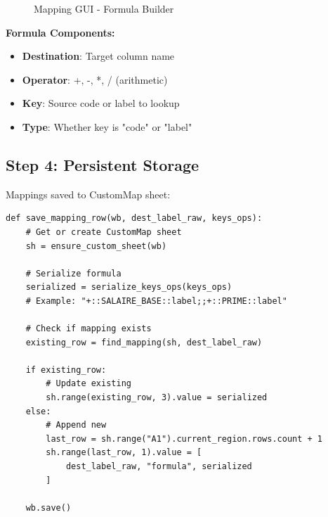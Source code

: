 \begin{figure}[H]
\centering
{}
\caption{Mapping GUI - Formula Builder}
\end{figure}

\textbf{Formula Components:}
\begin{itemize}
    \item \textbf{Destination}: Target column name
    \item \textbf{Operator}: +, -, *, / (arithmetic)
    \item \textbf{Key}: Source code or label to lookup
    \item \textbf{Type}: Whether key is "code" or "label"
\end{itemize}

\subsection{Step 4: Persistent Storage}

Mappings saved to CustomMap sheet:

\begin{lstlisting}[style=pythonstyle]
def save_mapping_row(wb, dest_label_raw, keys_ops):
    # Get or create CustomMap sheet
    sh = ensure_custom_sheet(wb)
    
    # Serialize formula
    serialized = serialize_keys_ops(keys_ops)
    # Example: "+::SALAIRE_BASE::label;;+::PRIME::label"
    
    # Check if mapping exists
    existing_row = find_mapping(sh, dest_label_raw)
    
    if existing_row:
        # Update existing
        sh.range(existing_row, 3).value = serialized
    else:
        # Append new
        last_row = sh.range("A1").current_region.rows.count + 1
        sh.range(last_row, 1).value = [
            dest_label_raw, "formula", serialized
        ]
    
    wb.save()
\end{lstlisting}

